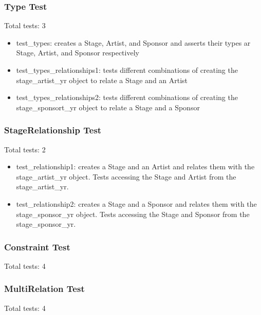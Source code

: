 \documentclass[12pt,english]{scrartcl}
\begin{document}
\subsubsection{Type Test}
Total tests: 3

\begin{itemize}
 \item test\_types: creates a Stage, Artist, and Sponsor and asserts their types ar Stage, Artist, and Sponsor respectively
 \item test\_types\_relationships1: tests different combinations of creating the stage_artist_yr object to relate a Stage and an Artist
 \item test\_types\_relationships2: tests different combinations of creating the stage_sponsort_yr object to relate a Stage and a Sponsor
\end{itemize}

\subsubsection{StageRelationship Test}
Total tests: 2

\begin{itemize}
 \item test\_relationship1: creates a Stage and an Artist and relates them with the stage_artist_yr object. Tests accessing the Stage and Artist from the stage_artist_yr.
 \item test\_relationship2: creates a Stage and a Sponsor and relates them with the stage_sponsor_yr object. Tests accessing the Stage and Sponsor from the stage_sponsor_yr.
 
\end{itemize}

\subsubsection{Constraint Test}
Total tests: 4
\begin{itemize}

\end{itemize} 

\subsubsection{MultiRelation Test} 
Total tests: 4

\begin{itemize}

\end{itemize}
\end{document}
